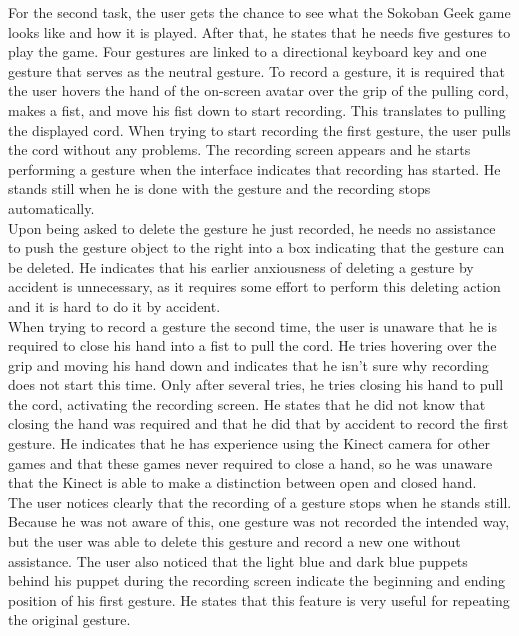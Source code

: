 For the second task, the user gets the chance to see what the Sokoban Geek game looks like and how it is played. After that, he states that he needs five gestures to play the game. Four gestures are linked to a directional keyboard key and one gesture that serves as the neutral gesture. To record a gesture, it is required that the user hovers the hand of the on-screen avatar over the grip of the pulling cord, makes a fist, and move his fist down to start recording. This translates to pulling the displayed cord. When trying to start recording the first gesture, the user pulls the cord without any problems. The recording screen appears and he starts performing a gesture when the interface indicates that recording has started. He stands still when he is done with the gesture and the recording stops automatically.\\

Upon being asked to delete the gesture he just recorded, he needs no assistance to push the gesture object to the right into a box indicating that the gesture can be deleted. He indicates that his earlier anxiousness of deleting a gesture by accident is unnecessary, as it requires some effort to perform this deleting action and it is hard to do it by accident.\\

When trying to record a gesture the second time, the user is unaware that he is required to close his hand into a fist to pull the cord. He tries hovering over the grip and moving his hand down and indicates that he isn't sure why recording does not start this time. Only after several tries, he tries closing his hand to pull the cord, activating the recording screen. He states that he did not know that closing the hand was required and that he did that by accident to record the first gesture. He indicates that he has experience using the Kinect camera for other games and that these games never required to close a hand, so he was unaware that the Kinect is able to make a distinction between open and closed hand.\\

The user notices clearly that the recording of a gesture stops when he stands still. Because he was not aware of this, one gesture was not recorded the intended way, but the user was able to delete this gesture and record a new one without assistance. The user also noticed that the light blue and dark blue puppets behind his puppet during the recording screen indicate the beginning and ending position of his first gesture. He states that this feature is very useful for repeating the original gesture.\\

